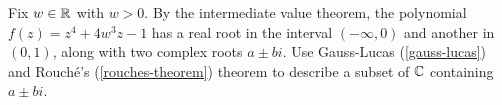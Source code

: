 \documentclass{homework}
\begin{document}
                                                                                                             \begin{problem}
                                                                                                               Fix $w \in \mathbb{R}$ with $w>0$.  By the intermediate value theorem, the
                                                                                                                 polynomial $f(z) = z^4 + 4w^3 z - 1$ has a real root in the interval
                                                                                                                   $(-\infty,0)$ and another in $(0,1)$, along with two complex roots
                                                                                                                     $a \pm bi$.  Use Gauss-Lucas (\ref{gauss-lucas}) and Rouch\'e's
                                                                                                                       (\ref{rouches-theorem}) theorem to describe a subset of $\mathbb{C}$
                                                                                                                         containing $a\pm bi$.
                                                                                                                         \end{problem}
\end{document}
